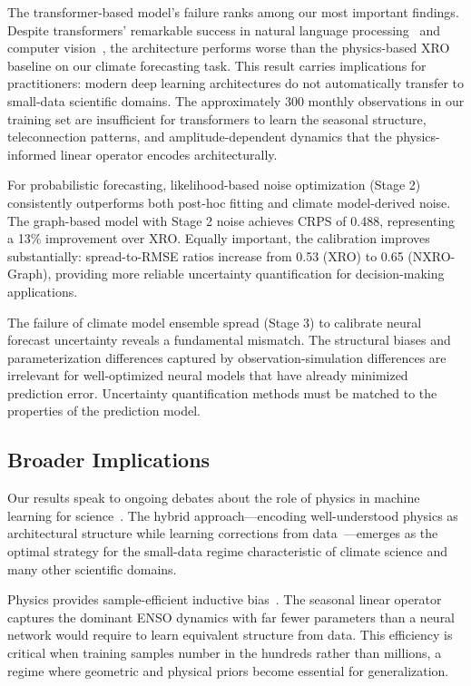 The transformer-based model's failure ranks among our most important findings. Despite transformers' remarkable success in natural language processing~\cite{vaswani2017attention} and computer vision~\cite{dosovitskiy2020image}, the architecture performs worse than the physics-based XRO baseline on our climate forecasting task. This result carries implications for practitioners: modern deep learning architectures do not automatically transfer to small-data scientific domains. The approximately 300 monthly observations in our training set are insufficient for transformers to learn the seasonal structure, teleconnection patterns, and amplitude-dependent dynamics that the physics-informed linear operator encodes architecturally.

For probabilistic forecasting, likelihood-based noise optimization (Stage 2) consistently outperforms both post-hoc fitting and climate model-derived noise. The graph-based model with Stage 2 noise achieves CRPS of 0.488, representing a 13\% improvement over XRO. Equally important, the calibration improves substantially: spread-to-RMSE ratios increase from 0.53 (XRO) to 0.65 (NXRO-Graph), providing more reliable uncertainty quantification for decision-making applications.

The failure of climate model ensemble spread (Stage 3) to calibrate neural forecast uncertainty reveals a fundamental mismatch. The structural biases and parameterization differences captured by observation-simulation differences are irrelevant for well-optimized neural models that have already minimized prediction error. Uncertainty quantification methods must be matched to the properties of the prediction model.

\subsection{Broader Implications}

Our results speak to ongoing debates about the role of physics in machine learning for science~\cite{karniadakis2021physics,willard2022integrating}. The hybrid approach---encoding well-understood physics as architectural structure while learning corrections from data~\cite{rackauckas2020universal,yin2021augmenting}---emerges as the optimal strategy for the small-data regime characteristic of climate science and many other scientific domains.

Physics provides sample-efficient inductive bias~\cite{bronstein2021geometric}. The seasonal linear operator captures the dominant ENSO dynamics with far fewer parameters than a neural network would require to learn equivalent structure from data. This efficiency is critical when training samples number in the hundreds rather than millions, a regime where geometric and physical priors become essential for generalization.


